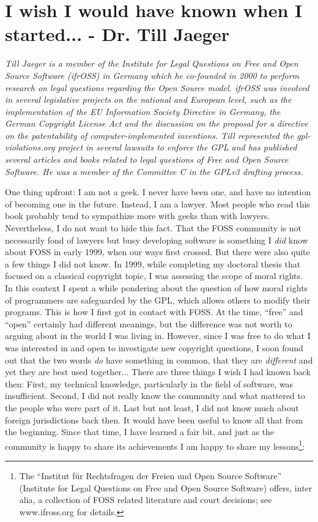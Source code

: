 \chapter{I wish I would have known when I started... - Dr. Till Jaeger} 

\textit{Till Jaeger is a member of the Institute for Legal Questions on Free and Open Source Software (ifrOSS) in Germany which he co-founded in 2000 to perform research on legal questions regarding the Open Source model. ifrOSS was involved in several legislative projects on the national and European level, such as the implementation of the EU Information Society Directive in Germany, the German Copyright License Act and the discussion on the proposal for a directive on the patentability of computer-implemented inventions.
\newline
Till represented the gpl-violations.org project in several lawsuits to enforce the GPL and has published several articles and books related to legal questions of Free and Open Source Software. He was a member of the Committee C in the GPLv3 drafting process.}

One thing upfront: I am not a geek. I never have been one, and have no intention of becoming one in the future. 
Instead, I am a lawyer. Most people who read this book probably tend to sympathize more with geeks than with lawyers. Nevertheless, I do not want to hide this fact. That the FOSS community is not necessarily fond of lawyers but busy developing software is something I \textit{did} know about FOSS in early 1999, when our ways first crossed. But there were also quite a few things I did not know.
In 1999, while completing my doctoral thesis that focused on a classical copyright topic, I was assessing the scope of moral rights. In this context I spent a while pondering about the question of how moral rights of programmers are safeguarded by the GPL, which allows others to modify their programs. This is how I first got in contact with FOSS. At the time, “free” and “open” certainly had different meanings, but the difference was not worth to arguing about in the world I was living in. However, since I was free to do what I was interested in and open to investigate new copyright questions, I soon found out that the two words \textit{do} have something in common, that they are \textit{different} and yet they are best used together...
There are three things I wish I had known back then:
First, my technical knowledge, particularly in the field of software, was insufficient. Second, I did not really know the community and what mattered to the people who were part of it. Last but not least, I did not know much about foreign jurisdictions back then. It would have been useful to know all that from the beginning.
Since that time, I have learned a fair bit, and just as the community is happy to share its achievements I am happy to share my lessons\footnote{The “Institut f\"ur Rechtsfragen der Freien und Open Source Software” (Institute for Legal Questions on Free and Open Source Software) offers, inter alia, a collection of FOSS related literature and court decisions; see www.ifross.org for details.}:

